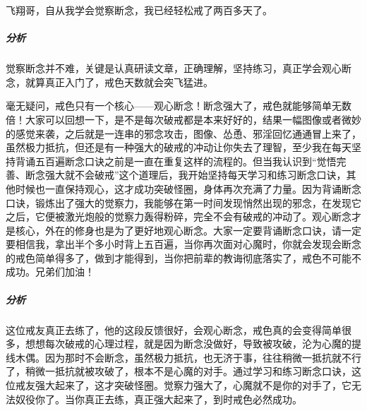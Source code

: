 \begin{case}
    飞翔哥，自从我学会觉察断念，我已经轻松戒了两百多天了。
    \subparagraph{分析} 觉察断念并不难，关键是认真研读文章，正确理解，坚持练习，真正学会观心断念，就算真正入门了，戒色天数就会突飞猛进。
\end{case}

\begin{case}
    毫无疑问，戒色只有一个核心——观心断念！断念强大了，戒色就能够简单无数倍！大家可以回想一下，是不是每次破戒都是本来好好的，结果一幅图像或者微妙的感觉来袭，之后就是一连串的邪念攻击，图像、怂恿、邪淫回忆通通冒上来了，虽然极力抵抗，但还是有一种强大的破戒的冲动让你失去了理智，至少我在每天坚持背诵五百遍断念口诀之前是一直在重复这样的流程的。但当我认识到“觉悟完善、断念强大就不会破戒”这个道理后，我开始坚持每天学习和练习断念口诀，其他时候也一直保持观心，这才成功突破怪圈，身体再次充满了力量。因为背诵断念口诀，锻炼出了强大的觉察力，我能够在第一时间发现悄然出现的邪念，在发现它之后，它便被激光炮般的觉察力轰得粉碎，完全不会有破戒的冲动了。观心断念才是核心，外在的修身也是为了更好地观心断念。大家一定要背诵断念口诀，请一定要相信我，拿出半个多小时背上五百遍，当你再次面对心魔时，你就会发现会断念的戒色简单得多了，做到才能得到，当你把前辈的教诲彻底落实了，戒色不可能不成功。兄弟们加油！
    \subparagraph{分析} 这位戒友真正去练了，他的这段反馈很好，会观心断念，戒色真的会变得简单很多，想想每次破戒的心理过程，就是因为断念没做好，导致被攻破，沦为心魔的提线木偶。因为那时不会断念，虽然极力抵抗，也无济于事，往往稍微一抵抗就不行了，稍微一抵抗就被攻破了，根本不是心魔的对手。通过学习和练习断念口诀，这位戒友强大起来了，这才突破怪圈。觉察力强大了，心魔就不是你的对手了，它无法奴役你了。当你真正去练，真正强大起来了，到时戒色必然成功。
\end{case}

